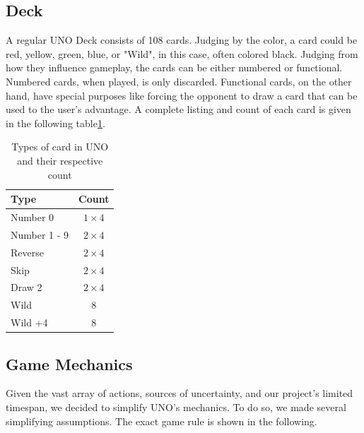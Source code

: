 \documentclass{article}
\begin{document}
\subsection{Deck}
A regular UNO Deck consists of 108 cards. Judging by the color, a card could be red, yellow, green, blue, or "Wild", in this case, often colored black. Judging from how they influence gameplay, the cards can be either numbered or functional. Numbered cards, when played, is only discarded. Functional cards, on the other hand, have special purposes like forcing the opponent to draw a card that can be used to the user's advantage. A complete listing and count of each card is given in the following table\ref{tab:card}.

\begin{table}[htbp]
    \centering
    \begin{tabular}{ l c }
    \toprule
    Type & Count \\\hline
    Number 0  & $1 \times 4$ \\
    Number 1 - 9   &  $2 \times 4$ \\
    Reverse & $2 \times 4$ \\
    Skip & $2 \times 4$ \\ 
    Draw 2 & $2 \times 4$ \\
    Wild & 8 \\ 
    Wild +4 & 8 \\
    \bottomrule
    \end{tabular}
    \caption{Types of card in UNO and their respective count}
    \label{tab:card}
\end{table}

\subsection{Game Mechanics}
Given the vast array of actions, sources of uncertainty, and our project's limited timespan, we decided to simplify UNO's mechanics. To do so, we made several simplifying assumptions. The exact game rule is shown in the following.
\end{document}
